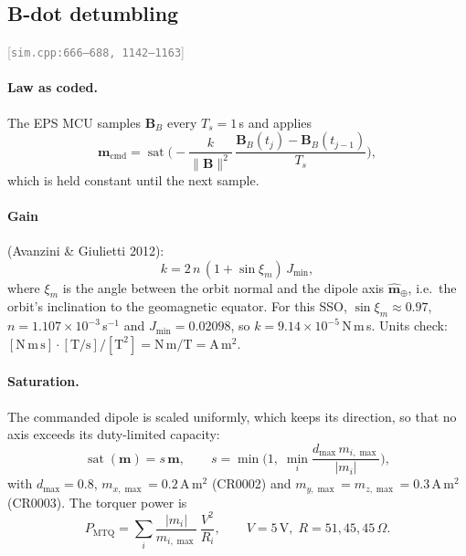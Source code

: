 \documentclass[11pt,a4paper]{article}
\newcommand{\vb}[1]{\boldsymbol{#1}}
\newcommand{\uv}[1]{\hat{\boldsymbol{#1}}}
\newcommand{\src}[1]{\textcolor{gray}{\small[\texttt{#1}]}}
\begin{document}
\subsection{B-dot detumbling}\label{sec:bdot} \src{sim.cpp:666--688, 1142--1163}
\paragraph{Law as coded.} The EPS MCU samples $\vb B_B$ every $T_s = 1$\,s and applies
\begin{equation}
\vb m_{\text{cmd}} = \operatorname{sat}\!\Big(-\frac{k}{\lVert\vb B\rVert^2}\,\frac{\vb B_B(t_j) - \vb B_B(t_{j-1})}{T_s}\Big),
\label{eq:bdot}
\end{equation}
which is held constant until the next sample.

\paragraph{Gain} (Avanzini \& Giulietti 2012):
\begin{equation}
k = 2\,n\,(1 + \sin\xi_m)\,J_{\min},
\end{equation}
where $\xi_m$ is the angle between the orbit normal and the dipole axis $\uv m_\oplus$, i.e.\ the orbit's inclination to the geomagnetic equator. For this SSO, $\sin\xi_m \approx 0.97$, $n = 1.107\times10^{-3}$\,s$^{-1}$ and $J_{\min} = 0.02098$, so $k = 9.14\times10^{-5}$\,N\,m\,s. Units check: $[\mathrm{N\,m\,s}]\cdot[\mathrm{T/s}]/[\mathrm{T^2}] = \mathrm{N\,m/T} = \mathrm{A\,m^2}$.

\paragraph{Saturation.} The commanded dipole is scaled uniformly, which keeps its direction, so that no axis exceeds its duty-limited capacity:
\begin{equation}
\operatorname{sat}(\vb m) = s\,\vb m,\qquad s = \min\Big(1,\; \min_i\frac{d_{\max}\,m_{i,\max}}{|m_i|}\Big),
\end{equation}
with $d_{\max} = 0.8$, $m_{x,\max} = 0.2$\,A\,m$^2$ (CR0002) and $m_{y,\max} = m_{z,\max} = 0.3$\,A\,m$^2$ (CR0003). The torquer power is
\begin{equation}
P_{\text{MTQ}} = \sum_i\frac{|m_i|}{m_{i,\max}}\,\frac{V^2}{R_i},\qquad V = 5\,\mathrm{V},\; R = 51, 45, 45\,\Omega .
\end{equation}
\end{document}
